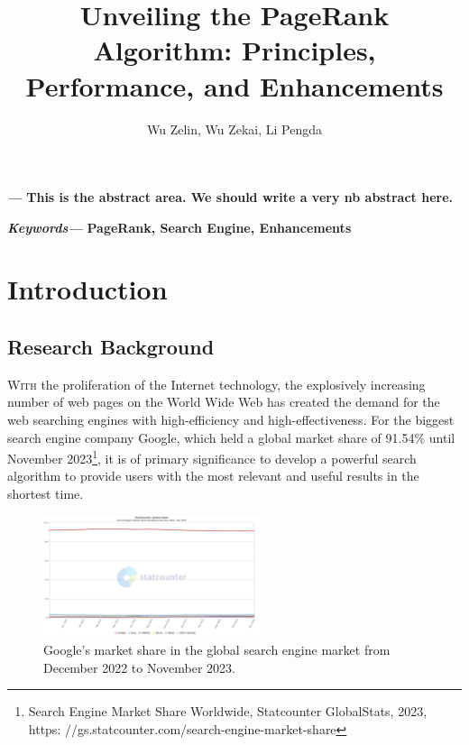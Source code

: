 \documentclass[lettersize,journal,12pt,conference]{IEEEtran}
\renewenvironment{abstract}
{\fontsize{12}{14}\textit{\textbf{\abstractname---}}\bfseries\ignorespaces}
{}
\renewenvironment{IEEEkeywords}
{\fontsize{12}{14}\textit{\textbf{Keywords---}}\bfseries\ignorespaces}{}
\begin{document}
\onehalfspacing
\title{Unveiling the PageRank Algorithm: Principles, Performance, and Enhancements}
\author{Wu Zelin, Wu Zekai, Li Pengda}

\maketitle\thispagestyle{headings}
%

\begin{abstract}
	This is the abstract area. We should write a very nb abstract here.
\end{abstract}

\begin{IEEEkeywords}
	PageRank, Search Engine, Enhancements
\end{IEEEkeywords}


\section{Introduction}

\subsection{Research Background}

\lettrine{W}{ith} 
the proliferation of the Internet technology, the explosively increasing number of web pages on the World Wide Web has created the demand for the web searching engines with high-efficiency and high-effectiveness. 
For the biggest search engine company Google, which held a global market share of 91.54\% until November 2023\footnote[1]{Search Engine Market Share Worldwide, Statcounter GlobalStats, 2023, https:
	//gs.statcounter.com/search-engine-market-share}, it is of primary significance to develop a powerful search algorithm to provide users with the most relevant and useful results in the shortest time.

\begin{figure}[h]
	\centering
	\includegraphics[width=2.5in]{images/fig2.png}
	\caption{Google's market share in the global search engine market from December 2022 to November 2023.}
	\label{fig1}
\end{figure}
\end{document}
